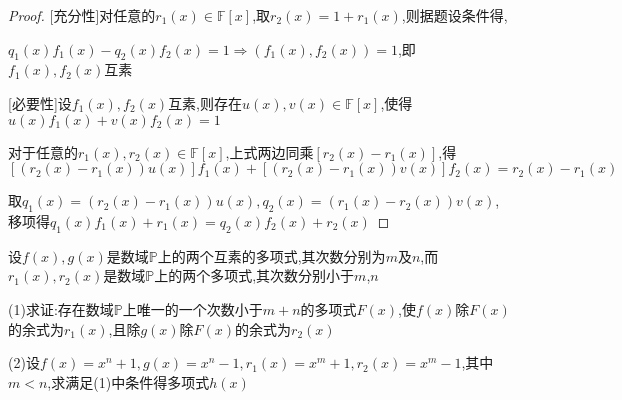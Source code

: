 \begin{proof}
    
    [充分性]对任意的$r_1(x)\in \mathbb{F}[x]$,取$r_2(x)=1+r_1(x)$,则据题设条件得,
    
    $q_1(x)f_1(x)-q_2(x)f_2(x)=1 \Longrightarrow (f_1(x),f_2(x))=1$,即$f_1(x),f_2(x)$互素 

    [必要性]设$f_1(x),f_2(x)$互素,则存在$u(x),v(x)\in \mathbb{F}[x]$,使得$u(x)f_1(x)+v(x)f_2(x)=1$

    对于任意的$r_1(x),r_2(x)\in \mathbb{F}[x]$,上式两边同乘$[r_2(x)-r_1(x)]$,得
    $$[(r_2(x)-r_1(x))u(x)]f_1(x)+[(r_2(x)-r_1(x))v(x)]f_2(x)=r_2(x)-r_1(x)$$

    取$q_1(x)=(r_2(x)-r_1(x))u(x),q_2(x)=(r_1(x)-r_2(x))v(x)$,移项得$q_1(x)f_1(x)+r_1(x)=q_2(x)f_2(x)+r_2(x)$
\end{proof}

\begin{example}
    设$f(x),g(x)$是数域$\mathbb{P}$上的两个互素的多项式,其次数分别为$m$及$n$,而$r_1(x),r_2(x)$是数域$\mathbb{P}$上的两个多项式,其次数分别小于$m$,$n$

    (1)求证:存在数域$\mathbb{P}$上唯一的一个次数小于$m+n$的多项式$F(x)$,使$f(x)$除$F(x)$的余式为$r_1(x)$,且除$g(x)$除$F(x)$的余式为$r_2(x)$

    (2)设$f(x)=x^n+1,g(x)=x^n-1,r_1(x)=x^m+1,r_2(x)=x^m-1$,其中$m<n$,求满足(1)中条件得多项式$h(x)$
\end{example}

